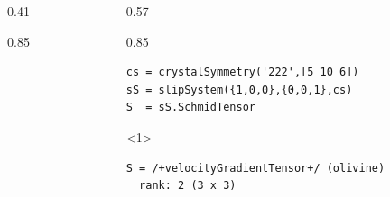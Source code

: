 \documentclass[compress,aspectratio=1610,fleqn]{beamer}
\begin{document}
\begin{frame}[fragile]
\begin{columns}
\begin{column}{0.41 \textwidth}
\begin{overlayarea}{\textwidth}{0.85\textheight}
         \end{overlayarea}
       \end{column}
    \begin{column}{0.57 \textwidth}
      \begin{overlayarea}{\textwidth}{0.85\textheight}
        \vspace{-0.5cm}
\begin{lstlisting}[style=input]
cs = crystalSymmetry('222',[5 10 6])
sS = slipSystem({1,0,0},{0,0,1},cs)
S  = sS.SchmidTensor
\end{lstlisting}
        \vspace{-0.3cm}
        \begin{onlyenv}<1>
\begin{lstlisting}[style=output]
S = /+velocityGradientTensor+/ (olivine)
  rank: 2 (3 x 3)
 

\end{lstlisting}
\end{onlyenv}
\end{overlayarea}
\end{column}
\end{columns}
\end{frame}
\end{document}
